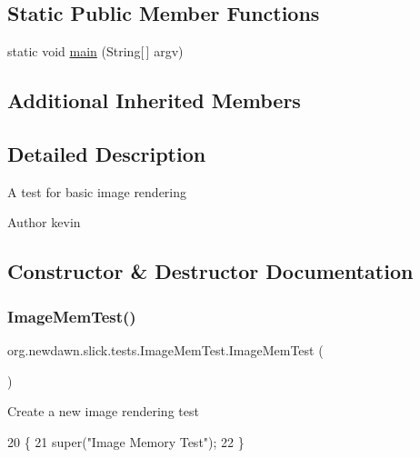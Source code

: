 \subsection*{Static Public Member Functions}
\begin{DoxyCompactItemize}
\item 
static void \mbox{\hyperlink{classorg_1_1newdawn_1_1slick_1_1tests_1_1_image_mem_test_a135897312e2c9c9ca7465ceb70a0abc4}{main}} (String\mbox{[}$\,$\mbox{]} argv)
\end{DoxyCompactItemize}
\subsection*{Additional Inherited Members}


\subsection{Detailed Description}
A test for basic image rendering

\begin{DoxyAuthor}{Author}
kevin 
\end{DoxyAuthor}


\subsection{Constructor \& Destructor Documentation}
\mbox{\label{classorg_1_1newdawn_1_1slick_1_1tests_1_1_image_mem_test_a8fd5f0fae6b302ef04b1f1af1176dbb1}} 
\subsubsection{\texorpdfstring{Image\+Mem\+Test()}{ImageMemTest()}}
{\footnotesize\ttfamily org.\+newdawn.\+slick.\+tests.\+Image\+Mem\+Test.\+Image\+Mem\+Test (\begin{DoxyParamCaption}{ }\end{DoxyParamCaption})\hspace{0.3cm}{\ttfamily [inline]}}

Create a new image rendering test 
\begin{DoxyCode}
20                           \{
21         super(\textcolor{stringliteral}{"Image Memory Test"});
22     \}
\end{DoxyCode}


